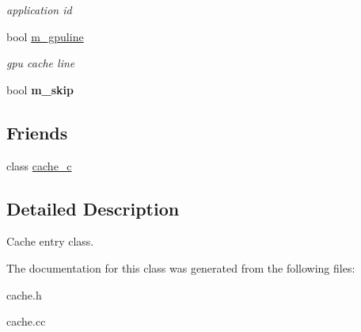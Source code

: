 \begin{DoxyCompactItemize}
\begin{DoxyCompactList}\small\item\em application id \item\end{DoxyCompactList}\item 
\hypertarget{classcache__entry__c_ae6ecd257d48ecef6327c7c031e84b648}{
bool \hyperlink{classcache__entry__c_ae6ecd257d48ecef6327c7c031e84b648}{m\_\-gpuline}}
\label{classcache__entry__c_ae6ecd257d48ecef6327c7c031e84b648}

\begin{DoxyCompactList}\small\item\em gpu cache line \item\end{DoxyCompactList}\item 
\hypertarget{classcache__entry__c_aa0efde757889938b2f1a699b00d1bb10}{
bool {\bfseries m\_\-skip}}
\label{classcache__entry__c_aa0efde757889938b2f1a699b00d1bb10}

\end{DoxyCompactItemize}
\subsection*{Friends}
\begin{DoxyCompactItemize}
\item 
\hypertarget{classcache__entry__c_a89745fab3bfd2ba77593b8b71bb77171}{
class \hyperlink{classcache__entry__c_a89745fab3bfd2ba77593b8b71bb77171}{cache\_\-c}}
\label{classcache__entry__c_a89745fab3bfd2ba77593b8b71bb77171}

\end{DoxyCompactItemize}


\subsection{Detailed Description}
Cache entry class. 

The documentation for this class was generated from the following files:\begin{DoxyCompactItemize}
\item 
cache.h\item 
cache.cc\end{DoxyCompactItemize}
